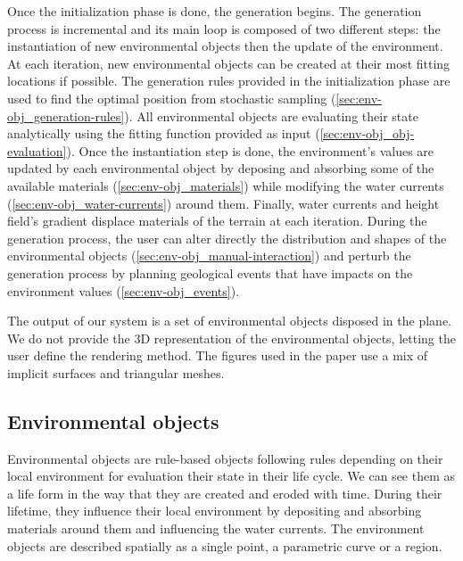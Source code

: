Once the initialization phase is done, the generation begins. The generation process is incremental and its main loop is composed of two different steps: the instantiation of new environmental objects then the update of the environment.
At each iteration, new environmental objects can be created at their most fitting locations if possible. The generation rules provided in the initialization phase are used to find the optimal position from stochastic sampling (\cref{sec:env-obj_generation-rules}). 
All environmental objects are evaluating their state analytically using the fitting function provided as input (\cref{sec:env-obj_obj-evaluation}).
Once the instantiation step is done, the environment's values are updated by each environmental object by deposing and absorbing some of the available materials (\cref{sec:env-obj_materials}) while modifying the water currents (\cref{sec:env-obj_water-currents}) around them. Finally, water currents and height field's gradient displace materials of the terrain at each iteration.
During the generation process, the user can alter directly the distribution and shapes of the environmental objects (\cref{sec:env-obj_manual-interaction}) and perturb the generation process by planning geological events that have impacts on the environment values (\cref{sec:env-obj_events}).

The output of our system is a set of environmental objects disposed in the plane. We do not provide the 3D representation of the environmental objects, letting the user define the rendering method. The figures used in the paper use a mix of implicit surfaces and triangular meshes.



\subsection{Environmental objects}
\label{sec:env-obj_environmental-objects}

Environmental objects are rule-based objects following rules depending on their local environment for evaluation their state in their life cycle. We can see them as a life form in the way that they are created and eroded with time. During their lifetime, they influence their local environment by depositing and absorbing materials around them and influencing the water currents. The environment objects are described spatially as a single point, a parametric curve or a region.

